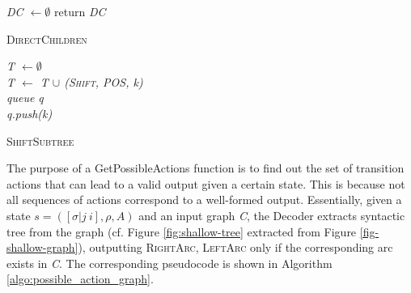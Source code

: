 \documentclass[11pt]{article}
\begin{document}
\begin{algorithm}\small
\DontPrintSemicolon {}
	\textit{DC $\gets \emptyset$}\;
  return \textit{DC}
\caption{\textsc{DirectChildren}}
\label{algo:direct_children}
\end{algorithm}


\begin{algorithm}\small
\DontPrintSemicolon {}
{\it T $\gets \emptyset$}\\
{\it T $\gets$ T $\cup$ {(\textsc{Shift}, POS, k)}}\\
{\it queue q}\\
{\it q.push(k)}\\
\caption{\textsc{ShiftSubtree}}
\label{algo:ShiftSubtree}
\end{algorithm}

The purpose of a {\sc GetPossibleActions} function is to find out the set of transition actions that can lead to a valid output given a certain state. This is because not all sequences of actions correspond to  a well-formed output. Essentially, given a state $s=([\sigma| j\ i], \rho, A)$ and an input graph {\it C}, the Decoder extracts syntactic tree from the graph (cf. Figure \ref{fig:shallow-tree} extracted from Figure \ref{fig-shallow-graph}), outputting \textsc{RightArc}, \textsc{LeftArc} only if the corresponding arc exists in {\it C}.  The corresponding pseudocode is shown in Algorithm \ref{algo:possible_action_graph}. 
\end{document}
